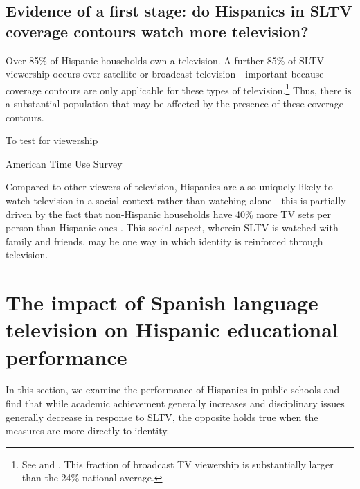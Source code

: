 \documentclass[11pt]{article}
\begin{document}

\subsection{Evidence of a first stage: do Hispanics in SLTV coverage contours watch more television?}

Over 85\% of Hispanic households own a television. A further 85\% of SLTV viewership occurs over satellite or broadcast television---important because coverage contours are only applicable for these types of television.\footnote{See \cite{noauthor_hispanic_2016} and \cite{de_la_merced_att_2014}. This fraction of broadcast TV viewership is substantially larger than the 24\% national average.} Thus, there is a substantial population that may be affected by the presence of these coverage contours.

To test for viewership 

American Time Use Survey


Compared to other viewers of television, Hispanics are also uniquely likely to watch television in a social context rather than watching alone---this is partially driven by the fact that non-Hispanic households have 40\% more TV sets per person than Hispanic ones \citep{coghill_tuning_2018}. This social aspect, wherein SLTV is watched with family and friends, may be one way in which identity is reinforced through television. 



\section{The impact of Spanish language television on Hispanic educational performance}\label{s:school}

In this section, we examine the performance of Hispanics in public schools and find that while academic achievement generally increases and disciplinary issues generally decrease in response to SLTV, the opposite holds true when the measures are more directly to identity. 
\end{document}
